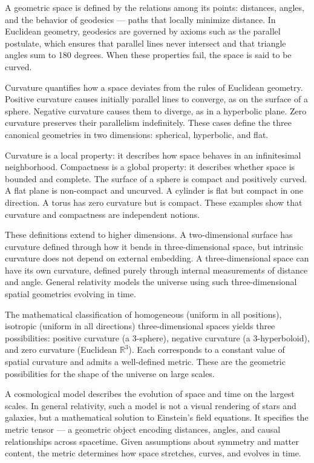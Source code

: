 A geometric space is defined by the relations among its points: distances, angles, and the behavior of geodesics — paths that locally minimize distance. In Euclidean geometry, geodesics are governed by axioms such as the parallel postulate, which ensures that parallel lines never intersect and that triangle angles sum to 180 degrees. When these properties fail, the space is said to be curved.

Curvature quantifies how a space deviates from the rules of Euclidean geometry. Positive curvature causes initially parallel lines to converge, as on the surface of a sphere. Negative curvature causes them to diverge, as in a hyperbolic plane. Zero curvature preserves their parallelism indefinitely. These cases define the three canonical geometries in two dimensions: spherical, hyperbolic, and flat.

Curvature is a local property: it describes how space behaves in an infinitesimal neighborhood. Compactness is a global property: it describes whether space is bounded and complete. The surface of a sphere is compact and positively curved. A flat plane is non-compact and uncurved. A cylinder is flat but compact in one direction. A torus has zero curvature but is compact. These examples show that curvature and compactness are independent notions.

These definitions extend to higher dimensions. A two-dimensional surface has curvature defined through how it bends in three-dimensional space, but intrinsic curvature does not depend on external embedding. A three-dimensional space can have its own curvature, defined purely through internal measurements of distance and angle. General relativity models the universe using such three-dimensional spatial geometries evolving in time.

The mathematical classification of homogeneous (uniform in all positions), isotropic (uniform in all directions) three-dimensional spaces yields three possibilities: positive curvature (a 3-sphere), negative curvature (a 3-hyperboloid), and zero curvature (Euclidean $\mathbb{R}^3$). Each corresponds to a constant value of spatial curvature and admits a well-defined metric. These are the geometric possibilities for the shape of the universe on large scales.

A cosmological model describes the evolution of space and time on the largest scales. In general relativity, such a model is not a visual rendering of stars and galaxies, but a mathematical solution to Einstein’s field equations. It specifies the metric tensor — a geometric object encoding distances, angles, and causal relationships across spacetime. Given assumptions about symmetry and matter content, the metric determines how space stretches, curves, and evolves in time.


